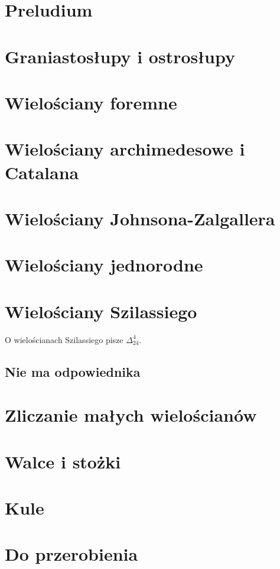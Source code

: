 

\section{Preludium}


\section{Graniastosłupy i ostrosłupy}



\section{Wielościany foremne}


\section{Wielościany archimedesowe i Catalana}



\section{Wielościany Johnsona-Zalgallera}


\section{Wielościany jednorodne}



\section{Wielościany Szilassiego}
O wielościanach Szilassiego pisze $\Delta_{24}^4$.

\subsection{Nie ma odpowiednika}


\section{Zliczanie małych wielościanów}


\section{Walce i stożki}

\section{Kule}

\section{Do przerobienia}
